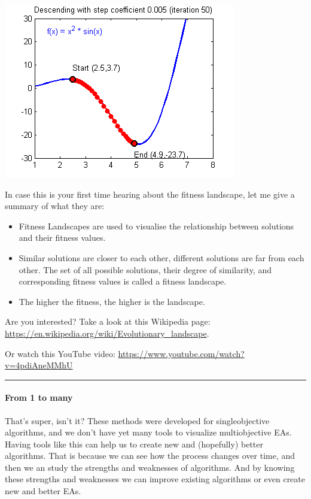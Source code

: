 \documentclass[
]{article}
\providecommand{\tightlist}{%
  \setlength{\itemsep}{0pt}\setlength{\parskip}{0pt}}
\begin{document}
\includegraphics[width=0.5\linewidth]{gifs/sgd}

In case this is your first time hearing about the fitness landscape, let
me give a summary of what they are:

\begin{itemize}
\tightlist
\item
  Fitness Landscapes are used to visualise the relationship between
  solutions and their fitness values.
\item
  Similar solutions are closer to each other, different solutions are
  far from each other. The set of all possible solutions, their degree
  of similarity, and corresponding fitness values is called a fitness
  landscape.
\item
  The higher the fitness, the higher is the landscape.
\end{itemize}

Are you interested? Take a look at this Wikipedia page:
\url{https://en.wikipedia.org/wiki/Evolutionary_landscape}.

Or watch this YouTube video:
\url{https://www.youtube.com/watch?v=4pdiAneMMhU}

\begin{center}\rule{0.5\linewidth}{0.5pt}\end{center}

\hypertarget{from-1-to-many}{%
\paragraph{From 1 to many}\label{from-1-to-many}}

That's super, isn't it? These methods were developed for singleobjective
algorithms, and we don't have yet many tools to visualize multiobjective
EAs. Having tools like this can help us to create new and (hopefully)
better algorithms. That is because we can see how the process changes
over time, and then we an study the strengths and weaknesses of
algorithms. And by knowing these strengths and weaknesses we can improve
existing algorithms or even create new and better EAs.
\end{document}
